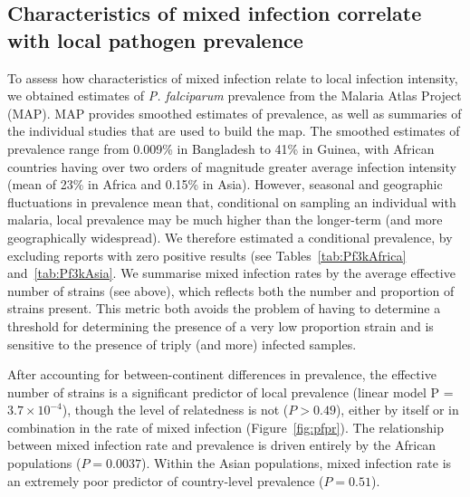 \documentclass[9pt,lineno]{elife}
\begin{document}
\subsection{Characteristics of mixed infection correlate with local pathogen prevalence}

To assess how characteristics of mixed infection relate to local infection intensity, we obtained estimates of {\it P. falciparum} prevalence from the Malaria Atlas Project (MAP).  MAP provides smoothed estimates of prevalence, as well as summaries of the individual studies that are used to build the map. The smoothed estimates of prevalence  range from 0.009\% in Bangladesh to 41\% in Guinea, with African countries having over two orders of magnitude greater average infection intensity (mean of 23\% in Africa and 0.15\% in Asia). However, seasonal and geographic fluctuations in prevalence mean that, conditional on sampling an individual with malaria, local prevalence may be much higher than the longer-term (and more geographically widespread).  We therefore estimated a conditional prevalence, by excluding reports with zero positive results (see Tables~\ref{tab:Pf3kAfrica} and~\ref{tab:Pf3kAsia}.
 We summarise mixed infection rates by the average effective number of strains (see above), which reflects both the number and proportion of strains present.  This metric both avoids the problem of having to determine a threshold for determining the presence of a very low proportion strain and is sensitive to the presence of triply (and more) infected samples.

After accounting for between-continent differences in prevalence, the effective number of strains is a significant predictor of local prevalence (linear model P = $3.7 \times 10^{-4}$), though the level of relatedness is not ($P>0.49$), either by itself or in combination in the rate of mixed infection (Figure~\ref{fig:pfpr}).  The relationship between mixed infection rate and prevalence is driven entirely by the African populations ($P = 0.0037$).  Within the Asian populations, mixed infection rate is an extremely poor predictor of country-level prevalence ($P = 0.51$). 
\end{document}
